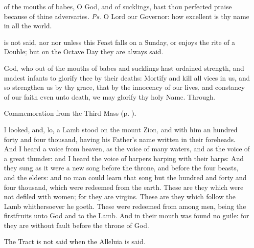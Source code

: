
\introit
{} of the mouths of babes, O God, and of sucklings, hast thou perfected praise because of thine adversaries. \textit{Ps.} O Lord our Governor: how excellent is thy name in all the world.
\begin{rubric}
     is not said, nor  nor  unless this Feast falls on a Sunday, or enjoys the rite of a  Double; but on the Octave Day they are always said.
\end{rubric}
\collect
{} God, who out of the mouths of babes and sucklings hast ordained strength, and madest infants to glorify thee by their deaths: Mortify and kill all vices in us, and so strengthen us by thy grace, that by the innocency of our lives, and constancy of our faith even unto death, we may glorify thy holy Name. Through.
\begin{rubric}
    Commemoration  from the Third Mass (p. \pageref{NativityMassIIICollect}).
\end{rubric}
 I looked, and, lo, a Lamb stood on the mount Zion, and with him an hundred forty and four thousand, having his Father's name written in their foreheads. And I heard a voice from heaven, as the voice of many waters, and as the voice of a great thunder: and I heard the voice of harpers harping with their harps: And they sung as it were a new song before the throne, and before the four beasts, and the elders: and no man could learn that song but the hundred and forty and four thousand, which were redeemed from the earth. These are they which were not defiled with women; for they are virgins. These are they which follow the Lamb whithersoever he goeth. These were redeemed from among men, being the firstfruits unto God and to the Lamb. And in their mouth was found no guile: for they are without fault before the throne of God.
\begin{rubric}
     The Tract is not said when the Alleluia is said.
\end{rubric}
